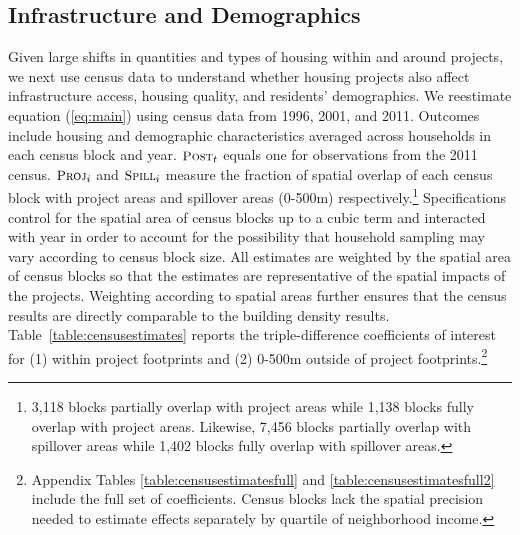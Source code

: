 \documentclass[12pt]{article}
\begin{document}
\subsection{Infrastructure and Demographics}\label{section:resultscensus}

Given large shifts in quantities and types of housing within and around projects, we next use census data to understand whether housing projects also affect infrastructure access, housing quality, and residents' demographics.  We reestimate equation (\ref{eq:main}) using census data from 1996, 2001, and 2011.  Outcomes include housing and demographic characteristics averaged across households in each census block and year.  $\textsc{\small Post}_{t}$ equals one for observations from the 2011 census.  $\textsc{\small Proj}_{i}$ and $\textsc{\small Spill}_{i}$ measure the fraction of spatial overlap of each census block with project areas and spillover areas (0-500m) respectively.\footnote{3,118 blocks partially overlap with project areas while 1,138 blocks fully overlap with project areas.  Likewise, 7,456 blocks partially overlap with spillover areas while 1,402 blocks fully overlap with spillover areas.}  Specifications control for the spatial area of census blocks up to a cubic term and interacted with year in order to account for the possibility that household sampling may vary according to census block size.  All estimates are weighted by the spatial area of census blocks so that the estimates are representative of the spatial impacts of the projects.  Weighting according to spatial areas further ensures that the census results are directly comparable to the building density results.  Table~\ref{table:censusestimates} reports the triple-difference coefficients of interest for (1) within project footprints and (2) 0-500m outside of project footprints.\footnote{Appendix Tables \ref{table:censusestimatesfull} and \ref{table:censusestimatesfull2} include the full set of coefficients.  Census blocks lack the spatial precision needed to estimate effects separately by quartile of neighborhood income.}  

\end{document}
